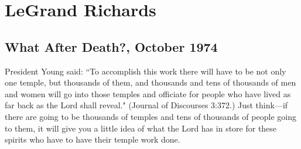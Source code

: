 \section{LeGrand Richards}

\subsection{What After Death?, October 1974}

President Young said: ``To accomplish this work there will have to be not only one temple, but thousands of them, and thousands and tens of thousands of men and women will go into those temples and officiate for people who have lived as far back as the Lord shall reveal." (Journal of Discourses 3:372.) Just think—if there are going to be thousands of temples and tens of thousands of people going to them, it will give you a little idea of what the Lord has in store for these spirits who have to have their temple work done.